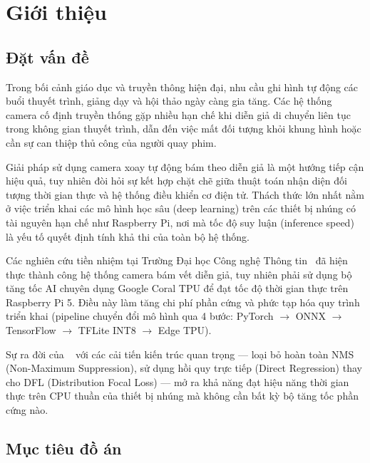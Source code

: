 \chapter{Giới thiệu}
\label{ch:introduction}

\section{Đặt vấn đề}
\label{sec:intro_problem}

Trong bối cảnh giáo dục và truyền thông hiện đại, nhu cầu ghi hình tự động các buổi thuyết trình, giảng dạy và hội thảo ngày càng gia tăng. Các hệ thống camera cố định truyền thống gặp nhiều hạn chế khi diễn giả di chuyển liên tục trong không gian thuyết trình, dẫn đến việc mất đối tượng khỏi khung hình hoặc cần sự can thiệp thủ công của người quay phim.

Giải pháp sử dụng camera xoay tự động bám theo diễn giả là một hướng tiếp cận hiệu quả, tuy nhiên đòi hỏi sự kết hợp chặt chẽ giữa thuật toán nhận diện đối tượng thời gian thực và hệ thống điều khiển cơ điện tử. Thách thức lớn nhất nằm ở việc triển khai các mô hình học sâu (deep learning) trên các thiết bị nhúng có tài nguyên hạn chế như Raspberry Pi, nơi mà tốc độ suy luận (inference speed) là yếu tố quyết định tính khả thi của toàn bộ hệ thống.

Các nghiên cứu tiền nhiệm tại Trường Đại học Công nghệ Thông tin~\cite{kltn_tiennhiem} đã hiện thực thành công hệ thống camera bám vết diễn giả, tuy nhiên phải sử dụng bộ tăng tốc AI chuyên dụng Google Coral TPU để đạt tốc độ thời gian thực trên Raspberry Pi 5. Điều này làm tăng chi phí phần cứng và phức tạp hóa quy trình triển khai (pipeline chuyển đổi mô hình qua 4 bước: PyTorch $\to$ ONNX $\to$ TensorFlow $\to$ TFLite INT8 $\to$ Edge TPU).

Sự ra đời của \yolo~\cite{yolo26} với các cải tiến kiến trúc quan trọng --- loại bỏ hoàn toàn NMS (Non-Maximum Suppression), sử dụng hồi quy trực tiếp (Direct Regression) thay cho DFL (Distribution Focal Loss) --- mở ra khả năng đạt hiệu năng thời gian thực trên CPU thuần của thiết bị nhúng mà không cần bất kỳ bộ tăng tốc phần cứng nào.

\section{Mục tiêu đồ án}
\label{sec:intro_objectives}

